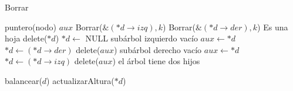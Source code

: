 \begin{Algoritmos}
\begin{algorithm}
\caption{Borrar}
\begin{algorithmic}[1]
	\State puntero(nodo) $aux$
		\State Borrar($\&(*d\to izq), k$)
	\Else 
			\State Borrar($\&(*d\to der), k$)
		\Else 
				\Comment Es una hoja
				\State delete($*d$)
				\State $*d\gets$ NULL
			\Else
					\Comment subárbol izquierdo vacío
					\State $aux \gets *d$
					\State $*d\gets (*d\to der)$
					\State delete($aux$)
				\Else
						\Comment subárbol derecho vacío
						\State $aux \gets *d$
						\State $*d\gets (*d\to izq)$
						\State delete($aux$)
					\Else
						\Comment el árbol tiene dos hijos
						
					\EndIf
				\EndIf
			\EndIf 
		\EndIf
	\EndIf
	\State balancear($d$)
	\State actualizarAltura($*d$)
\EndProcedure
\end{algorithmic}
\end{algorithm}

\end{Algoritmos}